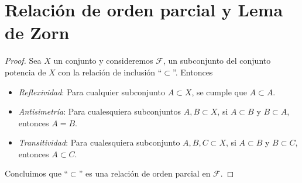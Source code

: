 
\section{Relación de orden parcial y Lema de Zorn}



\begin{definicion}\label{lkjbhgcdb}
\end{definicion}
\begin{observacion}
\end{observacion}


\begin{proposicion}\label{ibvdshkjcsd}
\end{proposicion}
\begin{proof}
	Sea $X$ un conjunto y consideremos $\mathcal{F}$, un subconjunto del conjunto potencia de $X$ con la relación de inclusión ``$\subset$''. Entonces
	
	\begin{itemize}
		\item \textit{Reflexividad}: Para cualquier subconjunto $A \subset X$, se cumple que $A \subset A$.
		
		\item \textit{Antisimetría}: Para cualesquiera  subconjuntos $A, B \subset X$, si $A \subset B$ y $B \subset A$, entonces $A = B$. 
		
		\item \textit{Transitividad}: Para cualesquiera subconjunto $A, B, C \subset X$, si $A \subset B$ y $B \subset C$, entonces $A \subset C$. 
	\end{itemize}
	Concluimos que ``$\subset$'' es una relación de orden parcial en $\mathcal{F}$.
\end{proof}



